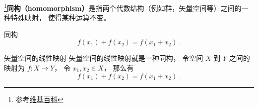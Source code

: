 
\begin{issues}
\end{issues}


\footnote{参考\href{https://en.wikipedia.org/wiki/Homomorphism}{维基百科}}\textbf{同构（homomorphism）}是指两个代数结构（例如群，矢量空间等）之间的一种特殊映射， 使得某种运算不变。

\begin{definition}{同构}
\begin{equation}
f(x_1) + f(x_2) = f(x_1 + x_2)~.
\end{equation}
\end{definition}

\begin{example}{矢量空间的线性映射}
矢量空间的线性映射就是一种同构， 令空间 $X$ 到 $Y$ 之间的映射为 $f:X\to Y$， 令 $x_1, x_2\in X$， 那么有
\begin{equation}
f(x_1) + f(x_2) = f(x_1 + x_2)~.
\end{equation}
\end{example}
